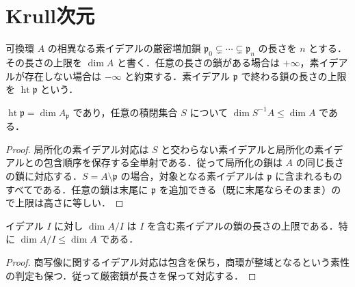 \section{Krull次元}
\begin{defn}[Krull次元と高さ]
可換環 $A$ の相異なる素イデアルの厳密増加鎖 $\mathfrak p_0\subsetneq\cdots\subsetneq\mathfrak p_n$ の長さを $n$ とする．その長さの上限を $\dim A$ と書く．任意の長さの鎖がある場合は $+\infty$，素イデアルが存在しない場合は $-\infty$ と約束する．素イデアル $\mathfrak p$ で終わる鎖の長さの上限を $\operatorname{ht}\mathfrak p$ という．
\end{defn}
\begin{prop}[局所化と高さ]
$\operatorname{ht}\mathfrak p=\dim A_{\mathfrak p}$ であり，任意の積閉集合 $S$ について $\dim S^{-1}A\le\dim A$ である．
\end{prop}
\begin{proof}
局所化の素イデアル対応は $S$ と交わらない素イデアルと局所化の素イデアルとの包含順序を保存する全単射である．従って局所化の鎖は $A$ の同じ長さの鎖に対応する．$S=A\setminus\mathfrak p$ の場合，対象となる素イデアルは $\mathfrak p$ に含まれるものすべてである．任意の鎖は末尾に $\mathfrak p$ を追加できる（既に末尾ならそのまま）ので上限は高さに等しい．
\end{proof}
\begin{prop}[商環の次元]
イデアル $I$ に対し $\dim A/I$ は $I$ を含む素イデアルの鎖の長さの上限である．特に $\dim A/I\le\dim A$ である．
\end{prop}
\begin{proof}
商写像に関するイデアル対応は包含を保ち，商環が整域となるという素性の判定も保つ．従って厳密鎖が長さを保って対応する．
\end{proof}
